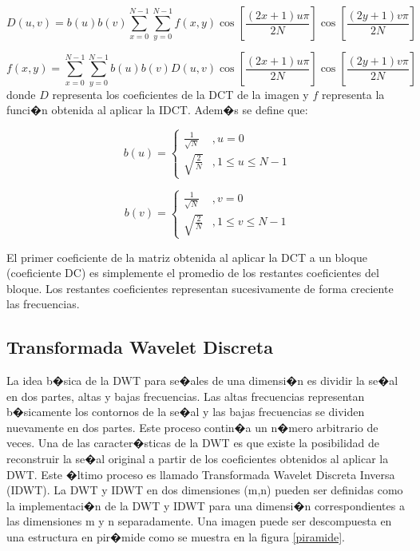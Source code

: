 \documentclass{rcci} %
\begin{document}
\begin{equation}
D(u,v)=b(u)b(v)\sum_{x=0}^{N-1}\sum_{y=0}^{N-1}f(x,y)\cos\left[\frac{\left(2x+1\right)u\pi}{2N}\right]\cos\left[\frac{\left(2y+1\right)v\pi}{2N}\right]
\end{equation}

\begin{equation}
f(x,y)=\sum_{x=0}^{N-1}\sum_{y=0}^{N-1}b(u)b(v)D(u,v)\cos\left[\frac{\left(2x+1\right)u\pi}{2N}\right]\cos\left[\frac{\left(2y+1\right)v\pi}{2N}\right]
\end{equation}
donde $D$ representa los coeficientes de la DCT de la imagen y $f$ representa la funci�n obtenida al aplicar
la IDCT. Adem�s se define que:

\begin{equation}
b(u)=\begin{cases}
\frac{1}{\sqrt{N}} & ,u=0\\
\sqrt{\frac{2}{N}} & ,1\leq u\leq N-1
\end{cases}
\end{equation}

\begin{equation}
b(v)=\begin{cases}
\frac{1}{\sqrt{N}} & ,v=0\\
\sqrt{\frac{2}{N}} & ,1\leq v\leq N-1
\end{cases}
\end{equation}

El primer coeficiente de la matriz obtenida al aplicar la DCT a un bloque (coeficiente DC) es simplemente el promedio
de los restantes coeficientes del bloque. Los restantes coeficientes representan sucesivamente de forma creciente las frecuencias.

\subsection{Transformada Wavelet Discreta}

La idea b�sica de la DWT para se�ales de una dimensi�n es dividir la se�al en dos partes, altas y bajas frecuencias.
Las altas frecuencias representan b�sicamente los contornos de la se�al y las bajas frecuencias se dividen nuevamente en dos
partes. Este proceso contin�a un n�mero arbitrario de veces. Una de las caracter�sticas de la DWT es que existe la posibilidad de reconstruir
la se�al original a partir de los coeficientes obtenidos al aplicar la DWT. Este �ltimo proceso es llamado Transformada
Wavelet Discreta Inversa (IDWT).
La DWT y IDWT en dos dimensiones (m,n) pueden ser definidas como la implementaci�n de la DWT y IDWT para una dimensi�n correspondientes a las
dimensiones m y n separadamente. Una imagen puede ser descompuesta en una estructura en pir�mide como se muestra en la figura \ref{piramide}.
\end{document}
